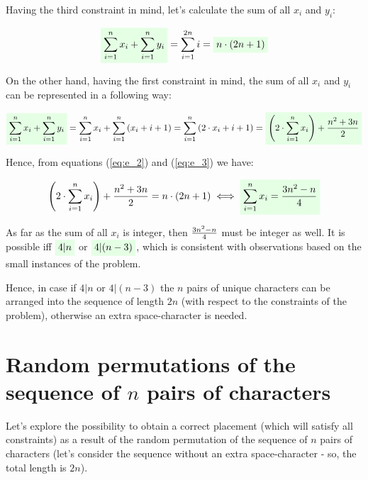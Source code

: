 \documentclass{article}
\newcommand{\highlight}[1]{\colorbox{green!10}{$\displaystyle#1$}}
\begin{document}
Having the third constraint in mind, let's calculate the sum of all $x_i$ and $y_i$:

\begin{equation} \label{eq:e_2}
\begin{split}
\highlight{ \sum_{i = 1}^{n} x_i + \sum_{i = 1}^{n} y_i } = \sum_{i = 1}^{2n} i = \highlight{ n \cdot (2n + 1) }
\end{split}
\end{equation}

On the other hand, having the first constraint in mind, the sum of all $x_i$ and $y_i$ can be represented in a following way:

\begin{equation} \label{eq:e_3}
\begin{split}
\highlight{ \sum_{i = 1}^{n} x_i + \sum_{i = 1}^{n} y_i } = \sum_{i = 1}^{n} x_i + \sum_{i = 1}^{n} \left( x_i + i + 1 \right) = \sum_{i = 1}^{n} \left( 2 \cdot x_i + i + 1 \right) = \highlight{ \left( 2 \cdot \sum_{i = 1}^{n} x_i \right) + {n^2 + 3n \over 2} }
\end{split}
\end{equation}

Hence, from equations (\ref{eq:e_2}) and (\ref{eq:e_3}) we have:

\begin{equation} \label{eq:e_4}
\begin{split}
\left( 2 \cdot \sum_{i = 1}^{n} x_i \right) + {n^2 + 3n \over 2} = n \cdot (2n + 1) \iff \highlight{ \sum_{i = 1}^{n} x_i = {3n^2-n \over 4} }
\end{split}
\end{equation}

As far as the sum of all $x_i$ is integer, then ${3n^2-n \over 4}$ must be integer as well. It is possible iff $\highlight{4 \vert n}$ or $\highlight{4 \vert (n-3)}$, which is consistent with observations based on the small instances of the problem.

Hence, in case if $4 \vert n$ or $4 \vert (n-3)$ the $n$ pairs of unique characters can be arranged into the sequence of length $2n$ (with respect to the constraints of the problem), otherwise an extra space-character is needed.

\section{Random permutations of the sequence of $n$ pairs of characters}

Let's explore the possibility to obtain a correct placement (which will satisfy all constraints) as a result of the random permutation of the sequence of $n$ pairs of characters (let's consider the sequence without an extra space-character - so, the total length is $2n$).
\end{document}

